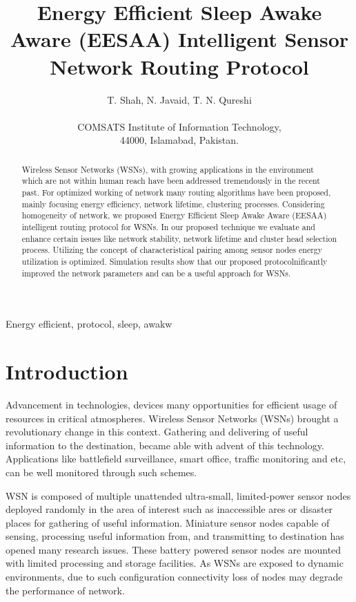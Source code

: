 \documentclass[journal]{IEEEtran}
\begin{document}
\title{Energy Efficient Sleep Awake Aware (EESAA) Intelligent Sensor Network Routing Protocol}


\author{T. Shah, N. Javaid, T. N. Qureshi\\ \vspace{0.4cm}


        COMSATS Institute of Information Technology,\\ 
        44000, Islamabad, Pakistan. 

        }
\maketitle


\begin{abstract}
Wireless Sensor Networks (WSNs), with growing applications in the environment which are not within human reach have been addressed tremendously in the recent past. For optimized working of network many routing algorithms have been proposed, mainly focusing energy efficiency, network lifetime, clustering processes. Considering homogeneity of network, we proposed Energy Efficient Sleep Awake Aware (EESAA) intelligent routing protocol for WSNs. In our proposed technique we evaluate and enhance certain issues like network stability, network lifetime and cluster head selection process. Utilizing the concept of characteristical pairing among sensor nodes energy utilization is optimized. Simulation results show that our proposed protocolnificantly improved the network parameters and can be a useful approach for WSNs.

\end{abstract}

\begin{IEEEkeywords}
Energy efficient, protocol, sleep, awakw
\end{IEEEkeywords}

\section{Introduction}
Advancement in technologies, devices many opportunities for efficient usage of resources in critical atmospheres. Wireless Sensor Networks (WSNs) brought a revolutionary change in this context. Gathering and delivering of useful information to the destination, became able with advent of this technology. Applications like battlefield surveillance, smart office, traffic monitoring and etc, can be well monitored through such schemes.

WSN is composed of multiple unattended ultra-small, limited-power sensor nodes deployed randomly in the area of interest such as inaccessible ares or disaster places for gathering of useful information. Miniature sensor nodes capable of sensing, processing useful information from, and transmitting to destination has opened many research issues. These battery powered sensor nodes are mounted with limited processing and storage facilities. As WSNs are exposed to dynamic environments, due to such configuration connectivity loss of nodes may degrade the performance of network.
\end{document}
